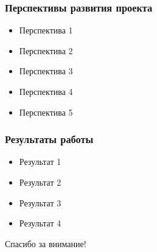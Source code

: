 \documentclass[14pt]{beamer}
\begin{document}
\begin{frame}
\frametitle{Перспективы развития проекта}
\begin{itemize}
  \item Перспектива 1
  \item Перспектива 2
  \item Перспектива 3
  \item Перспектива 4
  \item Перспектива 5
\end{itemize}
\end{frame}

\begin{frame}
\frametitle{Результаты работы}
\begin{itemize}
  \item Результат 1
  \item Результат 2
  \item Результат 3
  \item Результат 4
\end{itemize}
\end{frame}

\begin{frame}
\begin{center}
Спасибо за внимание!
\end{center}
\end{frame}
\end{document}
